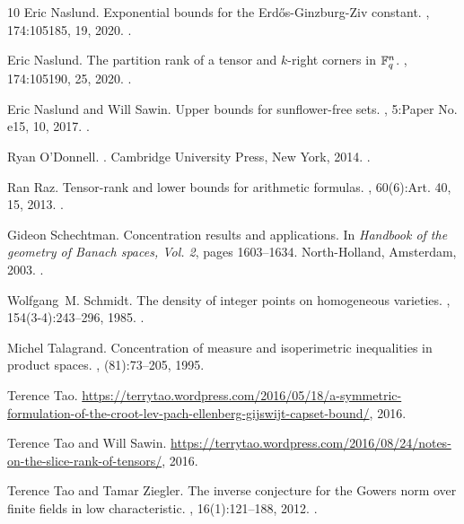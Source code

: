 \documentclass[10pt]{article}
\newcommand{\1}{\mathbf{1}}
\begin{document}
\begin{thebibliography}{10}
Eric Naslund.
\newblock Exponential bounds for the {Erd\H{o}s}-{G}inzburg-{Z}iv constant.
, 174:105185, 19, 2020.
\newblock \href {https://doi.org/10.1016/j.jcta.2019.105185} {}.

Eric Naslund.
\newblock The partition rank of a tensor and {$k$}-right corners in {$\Bbb F_q^n$}.
, 174:105190, 25, 2020.
\newblock \href {https://doi.org/10.1016/j.jcta.2019.105190} {}.

Eric Naslund and Will Sawin.
\newblock Upper bounds for sunflower-free sets.
, 5:Paper No. e15, 10, 2017.
\newblock \href {https://doi.org/10.1017/fms.2017.12} {}.

Ryan O'Donnell.
.
\newblock Cambridge University Press, New York, 2014.
\newblock \href {https://doi.org/10.1017/CBO9781139814782} {}.

Ran Raz.
\newblock Tensor-rank and lower bounds for arithmetic formulas.
, 60(6):Art. 40, 15, 2013.
\newblock \href {https://doi.org/10.1145/2535928} {}.

Gideon Schechtman.
\newblock Concentration results and applications.
\newblock In {\em Handbook of the geometry of {B}anach spaces, {V}ol. 2}, pages 1603--1634. North-Holland, Amsterdam, 2003.
\newblock \href {https://doi.org/10.1016/S1874-5849(03)80044-X} {}.

Wolfgang~M. Schmidt.
\newblock The density of integer points on homogeneous varieties.
, 154(3-4):243--296, 1985.
\newblock \href {https://doi.org/10.1007/BF02392473} {}.

Michel Talagrand.
\newblock Concentration of measure and isoperimetric inequalities in product spaces.
, (81):73--205, 1995.

Terence Tao.
\newblock \url{https://terrytao.wordpress.com/2016/05/18/a-symmetric-formulation-of-the-croot-lev-pach-ellenberg-gijswijt-capset-bound/}, 2016.

Terence Tao and Will Sawin.
\newblock \url{https://terrytao.wordpress.com/2016/08/24/notes-on-the-slice-rank-of-tensors/}, 2016.

Terence Tao and Tamar Ziegler.
\newblock The inverse conjecture for the {G}owers norm over finite fields in low characteristic.
, 16(1):121--188, 2012.
\newblock \href {https://doi.org/10.1007/s00026-011-0124-3} {}.

\end{thebibliography}
\end{document}
